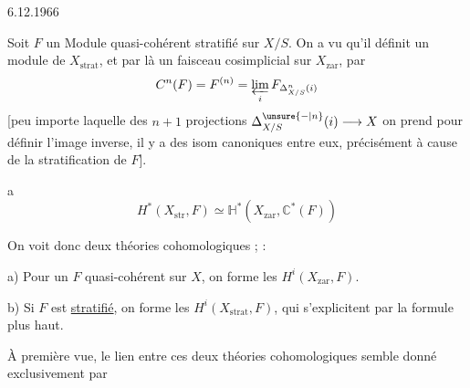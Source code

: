 \uline{}\hfill 6.12.1966

Soit $F$ un Module quasi-cohérent stratifié sur $X/S$. On a vu qu'il définit un module de $X_{\mathrm{strat}}$, et par là un faisceau cosimplicial  sur $X_{\mathrm{zar}}$, par
\[
C^n(F)=F^{(n)}=\varprojlim_i F_{\Delta^n_{X/S}(i)}
\]
[peu importe laquelle des $n+1$ projections $\Delta^{\unsure{-|n}}_{X/S}(i)\longrightarrow X$ on prend pour définir l'image inverse, il y a des isom canoniques entre eux, précisément à cause de la stratification de $F$].

 a
\[
\boxed{H^*(X_{\mathrm{str}},F)\simeq\mathbb H^*(X_{\mathrm{zar}},\mathbb C^*(F))}
\]

On voit donc deux théories cohomologiques ;     :

a) Pour un $F$ quasi-cohérent sur $X$, on forme les $H^i(X_{\mathrm{zar}},F)$.

b) Si $F$ est \uline{stratifié}, on forme les $H^i(X_{\mathrm{strat}},F)$, qui s'explicitent par la formule plus haut.

À première vue, le lien entre ces deux théories cohomologiques semble donné exclusivement par

